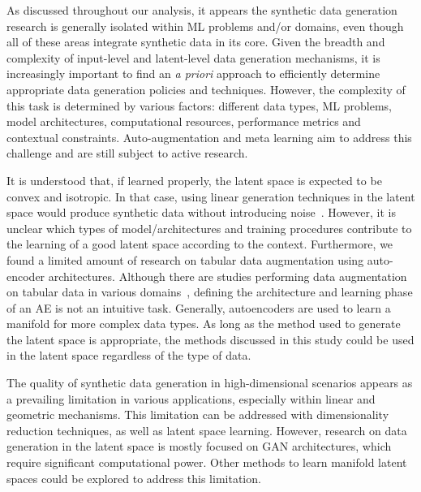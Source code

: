 As discussed throughout our analysis, it appears the synthetic data generation
research is generally isolated within ML problems and/or domains, even though
all of these areas integrate synthetic data in its core. Given the breadth and
complexity of input-level and latent-level data generation mechanisms, it is
increasingly important to find an \textit{a priori} approach to efficiently
determine appropriate data generation policies and techniques. However, the
complexity of this task is determined by various factors: different data
types, ML problems, model architectures, computational resources, performance
metrics and contextual constraints. Auto-augmentation and meta learning aim to
address this challenge and are still subject to active research.

It is understood that, if learned properly, the latent space is expected to be
convex and isotropic. In that case, using linear generation techniques in the
latent space would produce synthetic data without introducing
noise~\cite{cheung2020modals}. However, it is unclear which types of
model/architectures and training procedures contribute to the learning of a
good latent space according to the context. Furthermore, we found a limited
amount of research on tabular data augmentation using auto-encoder
architectures. Although there are studies performing data augmentation on
tabular data in various domains~\cite{delgado2021deep}, defining the
architecture and learning phase of an AE is not an intuitive task. Generally,
autoencoders are used to learn a manifold for more complex data types. As long
as the method used to generate the latent space is appropriate, the methods
discussed in this study could be used in the latent space regardless of the
type of data.

The quality of synthetic data generation in high-dimensional scenarios appears
as a prevailing limitation in various applications, especially within linear
and geometric mechanisms. This limitation can be addressed with dimensionality
reduction techniques, as well as latent space learning.  However, research on
data generation in the latent space is mostly focused on GAN architectures,
which require significant computational power. Other methods to learn manifold
latent spaces could be explored to address this limitation.

